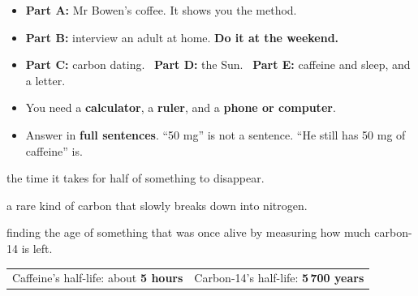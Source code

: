 \documentclass[12pt,a4paper]{article}
\newif\iffr
\newcommand{\fr}[1]{\unskip\iffr\par\nobreak\vspace{1pt}\noindent{\small\itshape\color{black!60}#1}\par\fi}
\newcommand{\frin}[1]{\unskip\iffr\ {\small\itshape\color{black!60}(#1)}\fi}
\newcommand{\fq}[1]{\guillemotleft\,#1\,\guillemotright}
\begin{document}
\begin{activity}[How to do this homework\frin{Comment faire ce devoir}]
  \begin{itemize}[itemsep=2pt, topsep=0pt]
    \item \textbf{Part A:} Mr Bowen's coffee. It shows you the method.
      \fr{Partie A~: le caf\'e de Mr Bowen. Elle te montre la m\'ethode.}
    \item \textbf{Part B:} interview an adult at home. \textbf{Do it at the
      weekend.}
      \fr{Partie B~: interviewe un adulte \`a la maison. Fais-le pendant le
      week-end.}
    \item \textbf{Part C:} carbon dating. \ \textbf{Part D:} the Sun.
      \ \textbf{Part E:} caffeine and sleep, and a letter.
      \fr{Partie C~: la datation au carbone 14. Partie D~: le Soleil. Partie
      E~: la caf\'eine et le sommeil, puis une lettre.}
    \item You need a \textbf{calculator}, a \textbf{ruler}, and a
      \textbf{phone or computer}.
      \fr{Il te faut une calculatrice, une r\`egle et un t\'el\'ephone ou un
      ordinateur.}
    \item Answer in \textbf{full sentences}. ``50 mg'' is not a sentence.
      ``He still has 50 mg of caffeine'' is.
      \fr{R\'eponds par des phrases compl\`etes, \textbf{en anglais}.
      \fq{50 mg} n'est pas une phrase~; \fq{He still has 50 mg of caffeine}
      en est une.}
  \end{itemize}
\end{activity}

\begin{remember}
   the time it takes for half of something to disappear.
  \fr{\eng{Half-life}, la demi-vie~: le temps qu'il faut pour que la moiti\'e
  de quelque chose disparaisse.}

  \vspace{3pt}
   a rare kind of carbon that slowly breaks down into nitrogen.
  \fr{\eng{Carbon-14}, le carbone 14~: une forme rare de carbone qui se
  transforme lentement en azote.}

  \vspace{3pt}
   finding the age of something that was once alive by
  measuring how much carbon-14 is left.
  \fr{\eng{Carbon dating}, la datation au carbone 14~: on trouve l'\^age d'une
  chose qui a \'et\'e vivante en mesurant le carbone 14 qui lui reste.}

  \vspace{5pt}
  \begin{tabular}{@{}l@{\quad}l@{}}
    Caffeine's half-life: about \textbf{5 hours} &
    Carbon-14's half-life: \textbf{5\,700 years}
  \end{tabular}
  \fr{Demi-vie de la caf\'eine~: environ 5 heures. \quad Demi-vie du carbone
  14~: 5\,700 ans.}
\end{remember}
\end{document}
